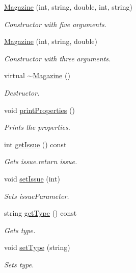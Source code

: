 \begin{DoxyCompactItemize}
\item 
\hyperlink{classMagazine_af32c7b2b56f8553579669f9f3200e2e7}{Magazine} (int, string, double, int, string)
\begin{DoxyCompactList}\small\item\em Constructor with five arguments. \end{DoxyCompactList}\item 
\hyperlink{classMagazine_ad79b115f747f89d5f1cebe268a94e0cb}{Magazine} (int, string, double)
\begin{DoxyCompactList}\small\item\em Constructor with three arguments. \end{DoxyCompactList}\item 
virtual \hyperlink{classMagazine_a0ba688d442bd6666825132522049da05}{$\sim$\+Magazine} ()\hypertarget{classMagazine_a0ba688d442bd6666825132522049da05}{}\label{classMagazine_a0ba688d442bd6666825132522049da05}

\begin{DoxyCompactList}\small\item\em Destructor. \end{DoxyCompactList}\item 
void \hyperlink{classMagazine_a64f61943072de7e5c608a52cf5ee86ac}{print\+Properties} ()\hypertarget{classMagazine_a64f61943072de7e5c608a52cf5ee86ac}{}\label{classMagazine_a64f61943072de7e5c608a52cf5ee86ac}

\begin{DoxyCompactList}\small\item\em Prints the properties. \end{DoxyCompactList}\item 
int \hyperlink{classMagazine_a56cc90a6e371be7618d2aa90fe1661f6}{get\+Issue} () const 
\begin{DoxyCompactList}\small\item\em Gets issue.\+return issue. \end{DoxyCompactList}\item 
void \hyperlink{classMagazine_a19df08bb3f6848601a04f03486d57099}{set\+Issue} (int)
\begin{DoxyCompactList}\small\item\em Sets issue\+Parameter. \end{DoxyCompactList}\item 
string \hyperlink{classMagazine_add89716aed6ace7cbdd624497874e6b0}{get\+Type} () const 
\begin{DoxyCompactList}\small\item\em Gets type. \end{DoxyCompactList}\item 
void \hyperlink{classMagazine_a29b2f7bd3ec5a76e9a5b0d06d64dec68}{set\+Type} (string)
\begin{DoxyCompactList}\small\item\em Sets type. \end{DoxyCompactList}\end{DoxyCompactItemize}


